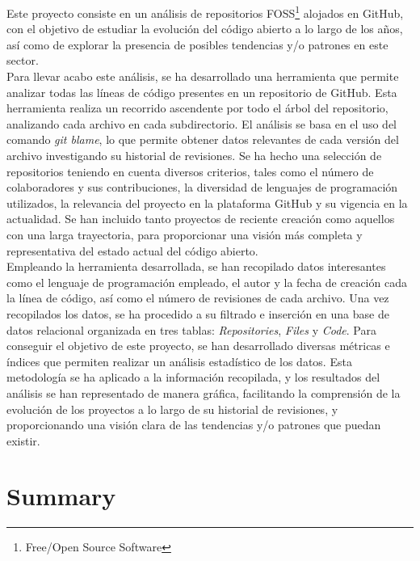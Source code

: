 \documentclass[a4paper, 12pt]{book}
\begin{document}
Este proyecto consiste en un análisis de repositorios FOSS\footnote{Free/Open Source Software} alojados en GitHub, con el
objetivo de estudiar la evolución del código abierto a lo largo de los años, así como de explorar la presencia de
posibles tendencias y/o patrones en este sector. 
\\Para llevar acabo este análisis, se ha desarrollado una herramienta que permite analizar todas las líneas de código presentes
en un repositorio de GitHub. Esta herramienta realiza un recorrido ascendente por todo el árbol del repositorio, analizando cada
archivo en cada subdirectorio. El análisis se basa en el uso del comando \textit{git blame}, lo que permite obtener datos relevantes
de cada versión del archivo investigando su historial de revisiones. 
Se ha hecho una selección de repositorios teniendo en cuenta diversos criterios, tales como el número de colaboradores y sus
contribuciones, la diversidad de lenguajes de programación utilizados, la relevancia del proyecto en la plataforma GitHub y su 
vigencia en la actualidad. Se han incluido tanto proyectos de reciente creación como aquellos con una larga trayectoria, para
proporcionar una visión más completa y representativa del estado actual del código abierto. 
\\Empleando la herramienta desarrollada, se han recopilado datos interesantes como el lenguaje de programación empleado,
el autor y la fecha de creación cada la línea de código, así como el número de revisiones de cada archivo. Una vez recopilados los datos,
se ha procedido a su filtrado e inserción en una base de datos relacional organizada en tres tablas: \textit{Repositories}, \textit{Files}
y \textit{Code}. Para conseguir el objetivo de este proyecto, se han desarrollado diversas métricas e índices que permiten realizar un análisis
estadístico de los datos. Esta metodología se ha aplicado a la información recopilada, y los resultados del análisis se han representado de
manera gráfica, facilitando la comprensión de la evolución de los proyectos a lo largo de su historial de revisiones, y proporcionando una
visión clara de las tendencias y/o patrones que puedan existir.


\chapter*{Summary}
\end{document}
